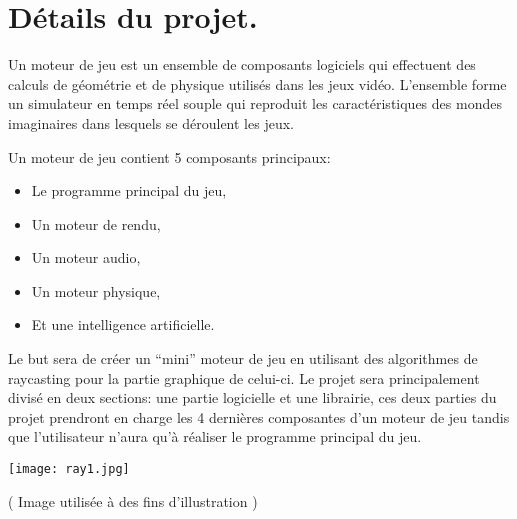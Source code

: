 \documentclass[french, 12pt]{article}
\begin{document}
    \color{black}\section{Détails du projet.}\begin{flushleft}
        Un moteur de jeu est un ensemble de composants logiciels qui effectuent des calculs de géométrie et de physique utilisés dans les jeux vidéo. L'ensemble forme un simulateur en temps réel souple qui reproduit les caractéristiques des mondes imaginaires dans lesquels se déroulent les jeux. \newline
    
        Un moteur de jeu contient 5 composants principaux: \newline 
    
        \begin{itemize}
            \item Le programme principal du jeu,
            \item Un moteur de rendu,
            \item Un moteur audio,
            \item Un moteur physique,
            \item Et une intelligence artificielle.
        \end{itemize}
        
        \vspace*{4mm}
    
        Le but sera de créer un “mini” moteur de jeu en utilisant des algorithmes de raycasting pour la partie graphique de celui-ci. Le projet sera principalement divisé en deux sections: une partie logicielle et une librairie, ces deux parties du projet prendront en charge les 4 dernières composantes d’un moteur de jeu tandis que l’utilisateur n’aura qu’à réaliser le programme principal du jeu. \newline
    \begin{center}
            \texttt{[image: ray1.jpg]}
            
            \tiny\color{gray}( Image utilisée à des fins d’illustration )
    \end{center}
    \end{flushleft}
    
    \newpage

    
\end{document}

